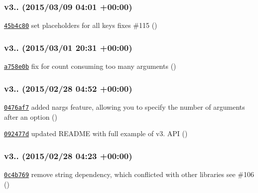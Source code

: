\subsubsection*{v3.. (2015/03/09 04\+:01 +00\+:00)}


\begin{DoxyItemize}
\item \href{https://github.com/bcoe/yargs/commit/45b4c80b890d02770b0a94f326695a8a566e8fe9}{\tt 45b4c80} set placeholders for all keys fixes \#115 ()
\end{DoxyItemize}

\subsubsection*{v3.. (2015/03/01 20\+:31 +00\+:00)}


\begin{DoxyItemize}
\item \href{https://github.com/bcoe/yargs/commit/a758e0b2556184f067cf3d9c4ef886d39817ebd2}{\tt a758e0b} fix for count consuming too many arguments ()
\end{DoxyItemize}

\subsubsection*{v3.. (2015/02/28 04\+:52 +00\+:00)}


\begin{DoxyItemize}
\item \href{https://github.com/bcoe/yargs/commit/0476af757966acf980d998b45108221d4888cfcb}{\tt 0476af7} added nargs feature, allowing you to specify the number of arguments after an option ()
\item \href{https://github.com/bcoe/yargs/commit/092477d7ab3efbf0ba11cede57f7d8cfc70b024f}{\tt 092477d} updated R\+E\+A\+D\+ME with full example of v3. A\+PI ()
\end{DoxyItemize}

\subsubsection*{v3.. (2015/02/28 04\+:23 +00\+:00)}


\begin{DoxyItemize}
\item \href{https://github.com/bcoe/yargs/commit/0c4b769516cd8d93a7c4e5e675628ae0049aa9a8}{\tt 0c4b769} remove string dependency, which conflicted with other libraries see \#106 ()
\end{DoxyItemize}

